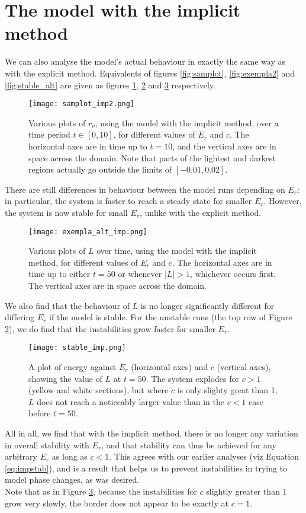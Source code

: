 \documentclass[11pt]{article}
\begin{document}
\section{The model with the implicit method}
We can also analyse the model's actual behaviour in exactly the same way as with the explicit method. Equivalents of figures \ref{fig:samplot}, \ref{fig:exempla2} and \ref{fig:stable_alt} are given as figures \ref{fig:samplot_imp2}, \ref{fig:exempla_alt_imp} and \ref{fig:stable_imp} respectively.
\begin{figure}[H]
\centering
\texttt{[image: samplot\_imp2.png]}
\caption{Various plots of $r_v$, using the model with the implicit method, over a time period $t\in[0,10]$, for different values of $E_r$ and $c$. The horizontal axes are in time up to $t=10$, and the vertical axes are in space across the domain. Note that parts of the lightest and darkest regions actually go outside the limits of $[-0.01,0.02]$.}
\label{fig:samplot_imp2}
\end{figure}
There are still differences in behaviour between the model runs depending on $E_r$: in particular, the system is faster to reach a steady state for smaller $E_r$. However, the system is now stable for small $E_r$, unlike with the explicit method.
\begin{figure}[H]
\centering
\texttt{[image: exempla\_alt\_imp.png]}
\caption{Various plots of $L$ over time, using the model with the implicit method, for different values of $E_r$ and $c$. The horizontal axes are in time up to either $t=50$ or whenever $|L|>1$, whichever occurs first. The vertical axes are in space across the domain.}
\label{fig:exempla_alt_imp}
\end{figure}
We also find that the behaviour of $L$ is no longer significantly different for differing $E_r$ if the model is stable. For the unstable runs (the top row of Figure \ref{fig:exempla_alt_imp}), we do find that the instabilities grow faster for smaller $E_r$.
\begin{figure}[H]
\centering
\texttt{[image: stable\_imp.png]}
\caption{A plot of energy against $E_r$ (horizontal axes) and $c$ (vertical axes), showing the value of $L$ at $t=50$. The system explodes for $c>1$ (yellow and white sections), but where $c$ is only slighty great than 1, $L$ does not reach a noticeably larger value than in the $c<1$ case before $t=50$.}
\label{fig:stable_imp}
\end{figure}
All in all, we find that with the implicit method, there is no longer any variation in overall stability with $E_r$, and that stability can thus be achieved for any arbitrary $E_r$ as long as $c<1$. This agrees with our earlier analyses (viz Equation \ref{eq:impstab}), and is a result that helps us to prevent instabilities in trying to model phase changes, as was desired. \\
Note that as in Figure \ref{fig:stable_imp}, because the instabilities for $c$ slightly greater than 1 grow very slowly, the border does not appear to be exactly at $c=1$.
\end{document}
